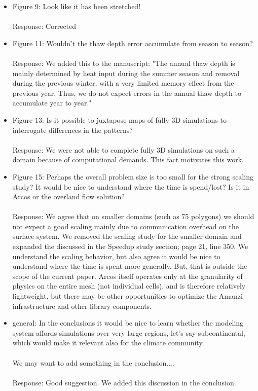\documentclass[12pt]{article}\usepackage{amsmath, amssymb, graphicx, array}
\begin{document}
\begin{itemize}
\item Figure 9: Look like it has been stretched! \\ \\
Response: Corrected

\item Figure 11: Wouldn't the thaw depth error accumulate from season to season? \\ \\
Response: We added this to the manuscript: "The annual thaw depth is mainly determined by heat input during the summer season and removal during the previous winter, with a very limited memory effect from the previous year. Thus, we do not expect errors in the annual thaw depth to accumulate year to year." 

\item Figure 13: Is it possible to juxtapose maps of fully 3D simulations to interrogate differences in the patterns? \\ \\
Response: We were not able to complete fully 3D simulations on such a domain because of computational demands.  This fact motivates this work.

\item Figure 15: Perhaps the overall problem size is too small for the strong scaling study? It would be nice to understand where the time is spend/lost? Is it in Arcos or the overland flow solution? \\ \\ 
Response: We agree that on smaller domains (such as 75 polygons) we should not expect a good scaling mainly due to communication overhead on the surface system. We removed the scaling study for the smaller domain and expanded the discussed in the Speedup study section; page 21, line 350. We understand the scaling behavior, but also agree it would be nice to understand where the time is spent more generally.  But, that is outside the scope of the current paper. Arcos itself operates only at the granularity of physics on the entire mesh (not individual cells), and is therefore relatively lightweight, but there may be other opportunities to optimize the Amanzi infrastructure and other library components.

\item general:  In the conclusions it would be nice to learn whether the modeling system affords simulations over very large regions, let's say subcontinental, which would make it relevant also for the climate community. \\ \\
We may want to add something in the conclusion....\\ \\
Response: Good suggestion. We added this discussion in the conclusion. 
\end{itemize}
\end{document}
